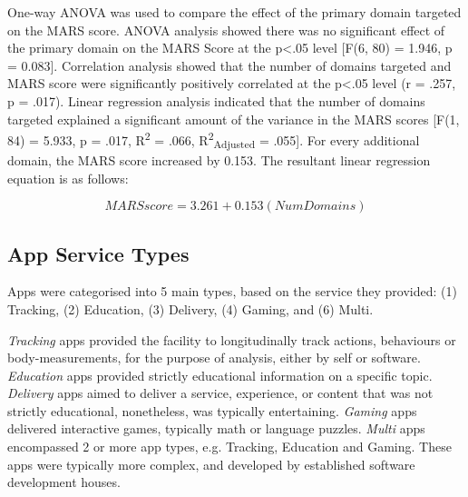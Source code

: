 One-way ANOVA was used to compare the effect of the primary domain targeted on the MARS score. ANOVA analysis showed there was no significant effect of the primary domain on the MARS Score at the p\textless.05 level [F(6, 80) = 1.946, p = 0.083].
Correlation analysis showed that the number of domains targeted and MARS score were significantly positively correlated at the p\textless.05 level (r = .257, p = .017). Linear regression analysis indicated that the number of domains targeted explained a significant amount of the variance in the MARS scores [F(1, 84) = 5.933, p = .017, R\textsuperscript{2} = .066, R\textsuperscript{2}\textsubscript{Adjusted} = .055]. For every additional domain, the MARS score increased by 0.153. The resultant linear regression equation is as follows:

\begin{equation}
MARSscore = 3.261 + 0.153 \left(NumDomains\right)
          \label{eq: calc-performance-stars}
\end{equation}

\subsection{App Service Types}
Apps were categorised into 5 main types, based on the service they provided: (1) Tracking, (2) Education, (3) Delivery, (4) Gaming, and (6) Multi.

\textit{Tracking} apps provided the facility to longitudinally track actions, behaviours or body-measurements, for the purpose of analysis, either by self or software.
\newline \textit{Education} apps provided strictly educational information on a specific topic.
\newline \textit{Delivery} apps aimed to deliver a service, experience, or content that was not strictly educational, nonetheless, was typically entertaining.
\newline \textit{Gaming} apps delivered interactive games, typically math or language puzzles.
\newline \textit{Multi} apps encompassed 2 or more app types, e.g. Tracking, Education and Gaming. These apps were typically more complex, and developed by established software development houses.


